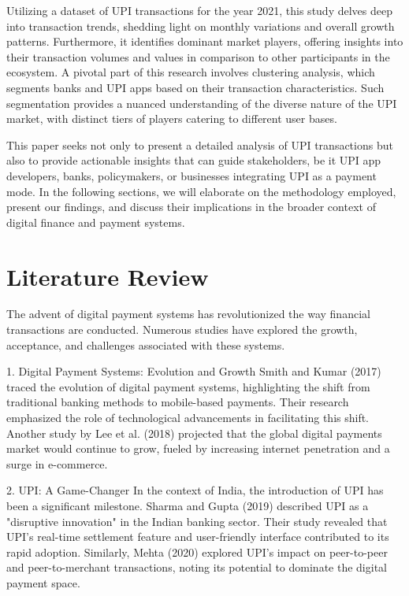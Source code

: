 \documentclass[12pt]{article}
\begin{document}
Utilizing a dataset of UPI transactions for the year 2021, this study delves deep into transaction trends, shedding light on monthly variations and overall growth patterns. Furthermore, it identifies dominant market players, offering insights into their transaction volumes and values in comparison to other participants in the ecosystem. A pivotal part of this research involves clustering analysis, which segments banks and UPI apps based on their transaction characteristics. Such segmentation provides a nuanced understanding of the diverse nature of the UPI market, with distinct tiers of players catering to different user bases.

This paper seeks not only to present a detailed analysis of UPI transactions but also to provide actionable insights that can guide stakeholders, be it UPI app developers, banks, policymakers, or businesses integrating UPI as a payment mode. In the following sections, we will elaborate on the methodology employed, present our findings, and discuss their implications in the broader context of digital finance and payment systems.

\section{Literature Review}

The advent of digital payment systems has revolutionized the way financial transactions are conducted. Numerous studies have explored the growth, acceptance, and challenges associated with these systems.

1. Digital Payment Systems: Evolution and Growth
Smith and Kumar (2017) traced the evolution of digital payment systems, highlighting the shift from traditional banking methods to mobile-based payments. Their research emphasized the role of technological advancements in facilitating this shift. Another study by Lee et al. (2018) projected that the global digital payments market would continue to grow, fueled by increasing internet penetration and a surge in e-commerce.

2. UPI: A Game-Changer
In the context of India, the introduction of UPI has been a significant milestone. Sharma and Gupta (2019) described UPI as a "disruptive innovation" in the Indian banking sector. Their study revealed that UPI's real-time settlement feature and user-friendly interface contributed to its rapid adoption. Similarly, Mehta (2020) explored UPI's impact on peer-to-peer and peer-to-merchant transactions, noting its potential to dominate the digital payment space.
\end{document}
